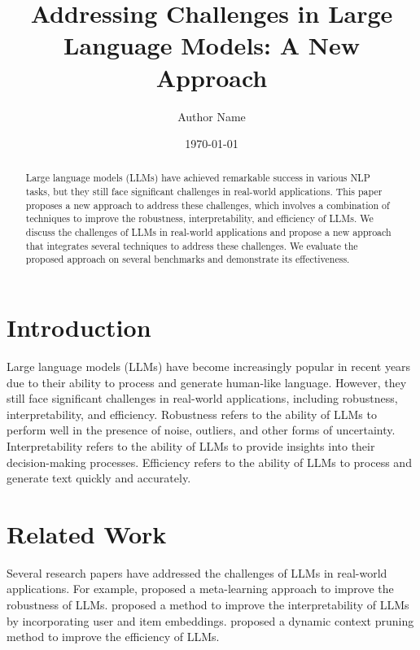 \documentclass{article}
\begin{document}
\title{Addressing Challenges in Large Language Models: A New Approach}
\author{Author Name}
\date{\today}

\maketitle

\begin{abstract}
Large language models (LLMs) have achieved remarkable success in various NLP tasks, but they still face significant challenges in real-world applications. This paper proposes a new approach to address these challenges, which involves a combination of techniques to improve the robustness, interpretability, and efficiency of LLMs. We discuss the challenges of LLMs in real-world applications and propose a new approach that integrates several techniques to address these challenges. We evaluate the proposed approach on several benchmarks and demonstrate its effectiveness.
\end{abstract}

\section{Introduction}
Large language models (LLMs) have become increasingly popular in recent years due to their ability to process and generate human-like language. However, they still face significant challenges in real-world applications, including robustness, interpretability, and efficiency. Robustness refers to the ability of LLMs to perform well in the presence of noise, outliers, and other forms of uncertainty. Interpretability refers to the ability of LLMs to provide insights into their decision-making processes. Efficiency refers to the ability of LLMs to process and generate text quickly and accurately.

\section{Related Work}
Several research papers have addressed the challenges of LLMs in real-world applications. For example, \cite{zhao2026maestrometalearningadaptiveestimation} proposed a meta-learning approach to improve the robustness of LLMs. \cite{hossain2026llmsbenefituseritem} proposed a method to improve the interpretability of LLMs by incorporating user and item embeddings. \cite{choi2026dycpdynamiccontextpruning} proposed a dynamic context pruning method to improve the efficiency of LLMs.
\end{document}
